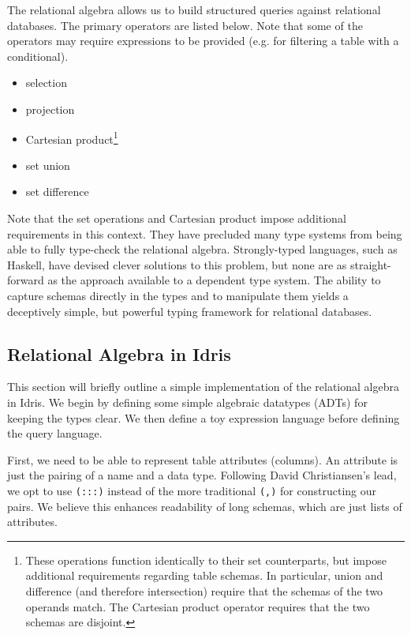 \documentclass[12pt]{article}
\begin{document}
The relational algebra allows us to build structured queries against relational databases.
The primary operators are listed below.
Note that some of the operators may require expressions to be provided (e.g. for filtering a table with a conditional).

\begin{itemize}
    \item selection
    \item projection
    \item Cartesian product\footnote{\label{fn:set_ops} These operations function identically to their set counterparts, but impose additional requirements regarding table schemas. In particular, union and difference (and therefore intersection) require that the schemas of the two operands match. The Cartesian product operator requires that the two schemas are disjoint.}
    \item set union\footnotemark[\ref{fn:set_ops}]
    \item set difference\footnotemark[\ref{fn:set_ops}]
\end{itemize}

Note that the set operations and Cartesian product impose additional requirements in this context.
They have precluded many type systems from being able to fully type-check the relational algebra.
Strongly-typed languages, such as Haskell, have devised clever solutions to this problem, but none are as straight-forward as the approach available to a dependent type system.
The ability to capture schemas directly in the types and to manipulate them yields a deceptively simple, but powerful typing framework for relational databases.

\subsection{Relational Algebra in Idris}

This section will briefly outline a simple implementation of the relational algebra in Idris.
We begin by defining some simple algebraic datatypes (ADTs) for keeping the types clear.
We then define a toy expression language before defining the query language.

First, we need to be able to represent table attributes (columns).
An attribute is just the pairing of a name and a data type.
Following David Christiansen's lead, we opt to use \texttt{(:::)} instead of the more traditional \texttt{(,)} for constructing our pairs.
We believe this enhances readability of long schemas, which are just lists of attributes.
\end{document}
